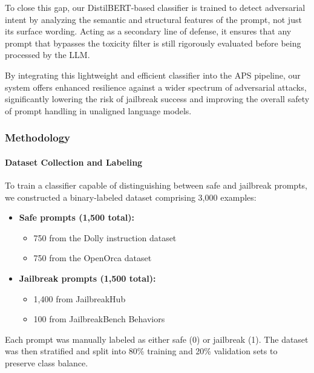 \documentclass[../main.tex]{subfiles}
\begin{document}
To close this gap, our DistilBERT-based classifier is trained to detect adversarial intent by analyzing the semantic and structural features of the prompt, not just its surface wording. Acting as a secondary line of defense, it ensures that any prompt that bypasses the toxicity filter is still rigorously evaluated before being processed by the LLM.

By integrating this lightweight and efficient classifier into the APS pipeline, our system offers enhanced resilience against a wider spectrum of adversarial attacks, significantly lowering the risk of jailbreak success and improving the overall safety of prompt handling in unaligned language models.


\clearpage



\subsubsection{Methodology}
\paragraph{Dataset Collection and Labeling}
To train a classifier capable of distinguishing between safe and jailbreak prompts, we constructed a binary-labeled dataset comprising 3,000 examples:
\begin{itemize}
    \item \textbf{Safe prompts (1,500 total):}
    \begin{itemize}
        \item 750 from the Dolly instruction dataset
        \item 750 from the OpenOrca dataset
    \end{itemize}
    \item \textbf{Jailbreak prompts (1,500 total):}
    \begin{itemize}
        \item 1,400 from JailbreakHub
        \item 100 from JailbreakBench Behaviors
    \end{itemize}
\end{itemize}
Each prompt was manually labeled as either safe (0) or jailbreak (1). The dataset was then stratified and split into 80\% training and 20\% validation sets to preserve class balance.
\end{document}
